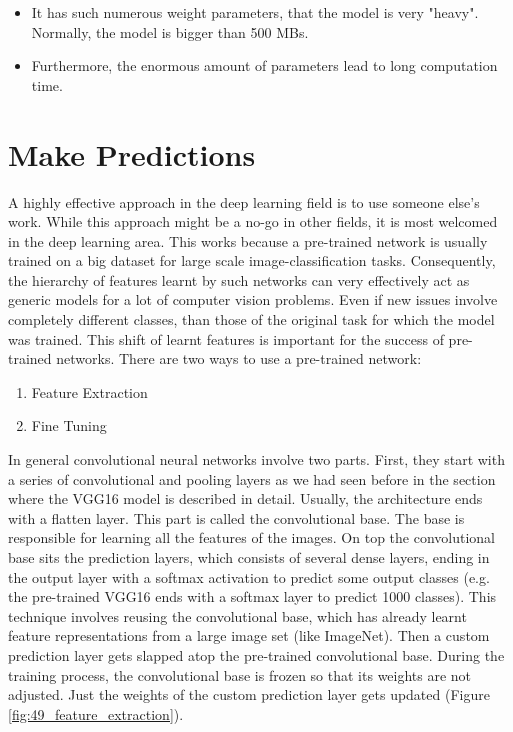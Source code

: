 \begin{itemize}
	\item It has such numerous weight parameters, that the model is very "heavy". Normally, the model is bigger than 500 MBs.
	\item Furthermore, the enormous amount of parameters lead to long computation time. 
\end{itemize}

\section{Make Predictions}
\label{make_predictions}

A highly effective approach in the deep learning field is to use someone else's work. While this approach might be a no-go in other fields, it is most welcomed in the deep learning area. This works because a pre-trained network is usually trained on a big dataset for large scale image-classification tasks. Consequently, the hierarchy of features learnt by such networks can very effectively act as generic models for a lot of computer vision problems. Even if new issues involve completely different classes, than those of the original task for which the model was trained. This shift of learnt features is important for the success of pre-trained networks. There are two ways to use a pre-trained network:

\begin{enumerate}
	\item Feature Extraction
	\item Fine Tuning
\end{enumerate}

In general convolutional neural networks involve two parts. First, they start with a series of convolutional and pooling layers as we had seen before in the section where the VGG16 model is described in detail. Usually, the architecture ends with a flatten layer. This part is called the convolutional base. The base is responsible for learning all the features of the images. On top the convolutional base sits the prediction layers, which consists of several dense layers, ending in the output layer with a softmax activation to predict some output classes (e.g. the pre-trained VGG16 ends with a softmax layer to predict 1000 classes). This technique involves reusing the convolutional base, which has already learnt feature representations from a large image set (like ImageNet). Then a custom prediction layer gets slapped atop the pre-trained convolutional base. During the training process, the convolutional base is frozen so that its weights are not adjusted. Just the weights of the custom prediction layer gets updated (Figure \ref{fig:49_feature_extraction}). 

